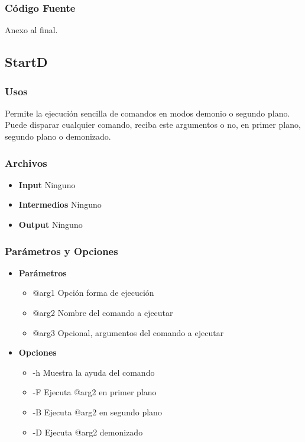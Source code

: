 \documentclass[a4paper,10pt,titlepage]{article}
\begin{document}
		\subsubsection{C\'odigo Fuente}
			Anexo al final.

	\subsection{StartD}
		\subsubsection{Usos}
			Permite la ejecuci\'on sencilla de comandos en modos demonio o segundo plano. Puede disparar cualquier comando, reciba este argumentos o no, en primer plano, segundo plano o demonizado.

		\subsubsection{Archivos}
			\begin {itemize}
				\item \textbf{Input } {Ninguno}
				\item \textbf{Intermedios } {Ninguno}
				\item \textbf{Output } {Ninguno}
			\end{itemize}

		\subsubsection{Par\'ametros y Opciones}
			\begin {itemize}
				\item \textbf{Par\'ametros} {
					\begin{itemize}
						\item {@arg1 }{Opci\'on forma de ejecuci\'on} 
						\item {@arg2 }{Nombre del comando a ejecutar} 
						\item {@arg3 }{Opcional, argumentos del comando a ejecutar} 
					\end{itemize}
				}
				\item \textbf{Opciones}{
					\begin{itemize}
						\item {-h }{Muestra la ayuda del comando} 
						\item {-F }{Ejecuta @arg2 en primer plano} 
						\item {-B }{Ejecuta @arg2 en segundo plano}
						\item {-D }{Ejecuta @arg2 demonizado}
					\end{itemize}
				}
			\end{itemize}
	
\end{document}
